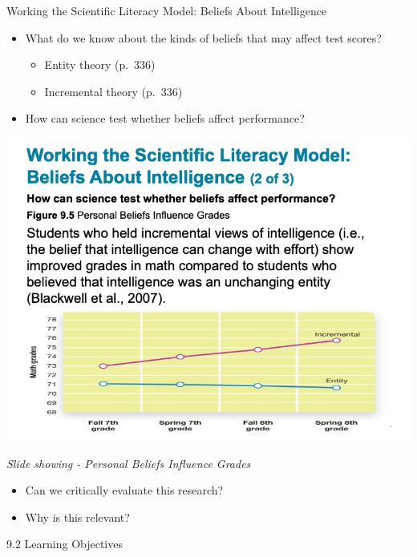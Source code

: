 \documentclass[
]{book}
\providecommand{\tightlist}{%
  \setlength{\itemsep}{0pt}\setlength{\parskip}{0pt}}
\begin{document}
\begin{reflect}
Working the Scientific Literacy Model: Beliefs About Intelligence

\begin{itemize}
\tightlist
\item
  What do we know about the kinds of beliefs that may affect test scores?

  \begin{itemize}
  \tightlist
  \item
    Entity theory (p.~336)\\
  \item
    Incremental theory (p.~336)\\
  \end{itemize}
\item
  How can science test whether beliefs affect performance?
\end{itemize}

\includegraphics{assets/unit_2/slide_19.png}

\emph{Slide showing - Personal Beliefs Influence Grades}

\begin{itemize}
\tightlist
\item
  Can we critically evaluate this research?\\
\item
  Why is this relevant?
\end{itemize}

9.2 Learning Objectives


\end{reflect}
\end{document}
